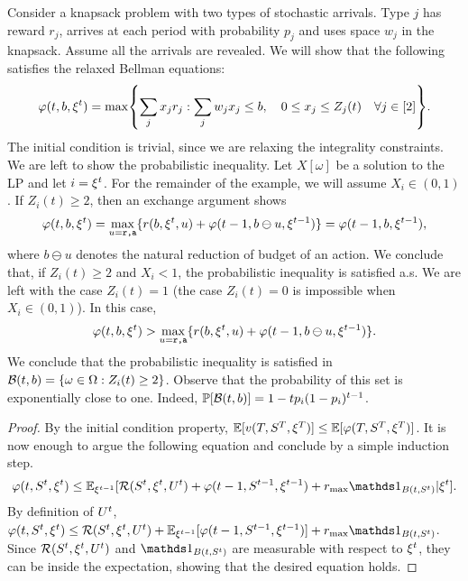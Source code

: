 \begin{example}
Consider a knapsack problem with two types of stochastic arrivals.
Type $j$ has reward $r_j$, arrives at each period with probability $p_j$ and uses space $w_j$ in the knapsack.
Assume all the arrivals are revealed.
We will show that the following satisfies the relaxed Bellman equations:
\[
\varphi(t,b,\xit) = \max\crl*{\sum_{j}x_jr_j:\sum_{j}w_jx_j\leq b, \quad 0\leq x_j \leq Z_j(t) \quad \forall j\in[2]}.
\]
The initial condition is trivial, since we are relaxing the integrality constraints.
We are left to show the probabilistic inequality.
Let $X[\omega]$ be a solution to the LP and let $i=\xi^t$.
For the remainder of the example, we will assume $X_i\in(0,1)$.
If $Z_i(t)\geq 2$,  then an exchange argument shows
\[
\varphi(t,b,\xi^t) = \max_{u=\texttt{r,a}}\{r(b,\xi^t,u)+\varphi(t-1,b\ominus u,\xi^{t-1})\}
= \varphi(t-1,b,\xi^{t-1}),
\]
where $b\ominus u$ denotes the natural reduction of budget of an action.
We conclude that, if $Z_i(t)\geq 2$ and $X_i<1$, the probabilistic inequality is satisfied a.s.
We are left with the case $Z_i(t)=1$ (the case $Z_i(t)=0$ is impossible when $X_i\in (0,1)$).
In this case, 
\[
\varphi(t,b,\xi^t) > \max_{u=\texttt{r,a}}\{r(b,\xi^t,u)+\varphi(t-1,b\ominus u,\xi^{t-1})\}.
\]
We conclude that the probabilistic inequality is satisfied in $\mathcal{B}(t,b)=\{\omega\in\Omega:Z_i(t)\geq 2\}$.
Observe that the probability of this set is exponentially close to one.
Indeed, $\mathbb{P}[\mathcal{B}(t,b)]=1-tp_i(1-p_i)^{t-1}$.
\end{example}

\begin{proof}
By the initial condition property, $\mathbb{E}[v(T,S^T,\xi^T)] \leq \mathbb{E}[\varphi(T,S^T,\xi^T)]$.
It is now enough to argue the following equation and conclude by a simple induction step.
\[
\varphi(t,\St,\xit)\leq \E_{\xi^{t-1}}[\Re(\St,\xit,\Ut)+\varphi(t-1,S^{t-1},\xi^{t-1}) +  \rmax\Ins{B(t,\St)}|\xit].
\]
By definition of $U^t$, $\varphi(t,\St,\xit)\leq \Re(\St,\xit,\Ut)+\E_{\xi^{t-1}}[\varphi(t-1,S^{t-1},\xi^{t-1})] +  \rmax\Ins{B(t,\St)}$.
Since $\mathcal{R}(S^t,\xi^t,U^t)$ and $\Ins{B(t,\St)}$ are measurable with respect to $\xi^t$, they can be inside the expectation, showing that the desired equation holds.
\end{proof}

